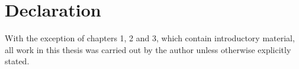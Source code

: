 \chapter{Declaration}

With the exception of chapters 1, 2 and 3, which contain introductory material, all work in this thesis was carried out by the author unless otherwise explicitly stated.
